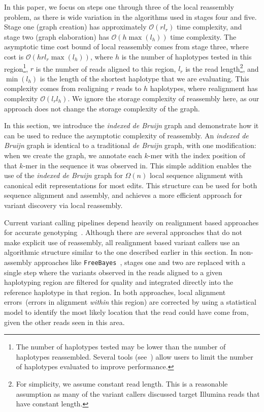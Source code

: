 \documentclass[masters]{ucbthesis}
\begin{document}
In this paper, we focus on steps one through three of the local reassembly problem, as there is wide
variation in the algorithms used in stages four and five. Stage one (graph
creation) has approximately $\mathcal{O}(r l_r)$ time complexity, and stage two (graph elaboration) has
$\mathcal{O}(h \max(l_h))$ time complexity.
The asymptotic time cost bound of local reassembly comes from stage three, where cost is $\mathcal{O}(h r l_r
\max(l_h))$, where $h$ is the number of haplotypes tested in this region\footnote{The number of
haplotypes tested may be lower than the number of haplotypes reassembled. Several tools
(see~\cite{depristo11,garrison12}) allow users to limit the number of haplotypes evaluated to improve
performance.}, $r$ is the number of reads aligned to this region, $l_r$ is the read length\footnote{For
simplicity, we assume constant read length. This is a reasonable assumption as many of the variant
callers discussed target Illumina reads that have constant length.}, and $\min(l_h)$ is the length of the
shortest haplotype that we are evaluating. This complexity comes from realigning $r$ reads to $h$
haplotypes, where realignment has complexity $\mathcal{O}(l_r l_h)$. We ignore the storage complexity of
reassembly here, as our approach does not change the storage complexity of the graph.

In this section, we introduce the \emph{indexed de Bruijn} graph and demonstrate how it can be used to
reduce the asymptotic complexity of reassembly. An \emph{indexed de Bruijn} graph is identical to a
traditional \emph{de Bruijn} graph, with one modification: when we create the graph, we annotate each
$k$-mer with the index position of that $k$-mer in the sequence it was observed in. This simple addition
enables the use of the \emph{indexed de Bruijn} graph for $\Omega(n)$ local sequence alignment with
canonical edit representations for most edits. This structure can be used for both sequence alignment and
assembly, and achieves a more efficient approach for variant discovery via local reassembly.

Current variant calling pipelines depend heavily on realignment based approaches for accurate
genotyping~\cite{li14}. Although there are several approaches that do not make explicit use of reassembly,
all realignment based variant callers use an algorithmic structure similar to the one described earlier in this section.
In non-assembly approaches like \texttt{FreeBayes}~\cite{garrison12}, stages
one and two are replaced with a single step where the variants observed in the reads aligned to a given
haplotyping region are filtered for quality and integrated directly into the reference haplotype in that region.
In both approaches, local alignment errors~(errors in alignment \emph{within} this region) are corrected
by using a statistical model to identify the most likely location that the read could have come from, given
the other reads seen in this area.
\end{document}
